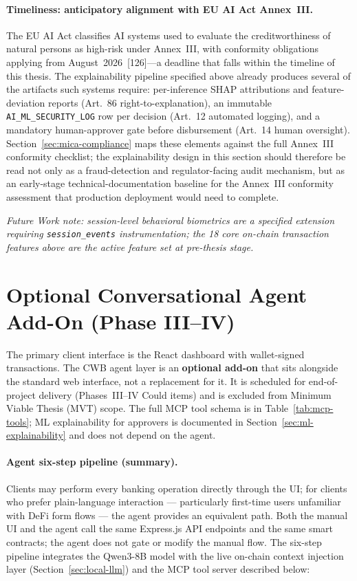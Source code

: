 \documentclass[12pt,a4paper]{report}
\begin{document}
\paragraph{Timeliness: anticipatory alignment with EU AI Act Annex~III.}
The EU AI Act classifies AI systems used to evaluate the creditworthiness
of natural persons as high-risk under Annex~III, with conformity
obligations applying from August~2026~[126]---a deadline that falls
within the timeline of this thesis. The explainability pipeline specified
above already produces several of the artifacts such systems require:
per-inference SHAP attributions and feature-deviation reports (Art.~86
right-to-explanation), an immutable \texttt{AI\_ML\_SECURITY\_LOG} row per
decision (Art.~12 automated logging), and a mandatory human-approver gate
before disbursement (Art.~14 human oversight). Section~\ref{sec:mica-compliance}
maps these elements against the full Annex~III conformity checklist; the
explainability design in this section should therefore be read not only
as a fraud-detection and regulator-facing audit mechanism, but as an
early-stage technical-documentation baseline for the Annex~III conformity
assessment that production deployment would need to complete.

\noindent\textit{Future Work note: session-level behavioral biometrics are a specified extension requiring \texttt{session\_events} instrumentation; the 18 core on-chain transaction features above are the active feature set at pre-thesis stage.}

\section{Optional Conversational Agent Add-On (Phase III--IV)}
\label{sec:optional-agent}

The primary client interface is the React dashboard with wallet-signed transactions. The CWB agent layer is an \textbf{optional add-on} that sits alongside the standard web interface, not a replacement for it. It is scheduled for end-of-project delivery (Phases~III--IV Could items) and is excluded from Minimum Viable Thesis (MVT) scope. The full MCP tool schema is in Table~\ref{tab:mcp-tools}; ML explainability for approvers is documented in Section~\ref{sec:ml-explainability} and does not depend on the agent.

\paragraph{Agent six-step pipeline (summary).} Clients may perform every banking operation directly through the UI; for clients who prefer plain-language interaction --- particularly first-time users unfamiliar with DeFi form flows --- the agent provides an equivalent path. Both the manual UI and the agent call the same Express.js API endpoints and the same smart contracts; the agent does not gate or modify the manual flow. The six-step pipeline integrates the Qwen3-8B model with the live on-chain context injection layer (Section~\ref{sec:local-llm}) and the MCP tool server described below:
\end{document}

